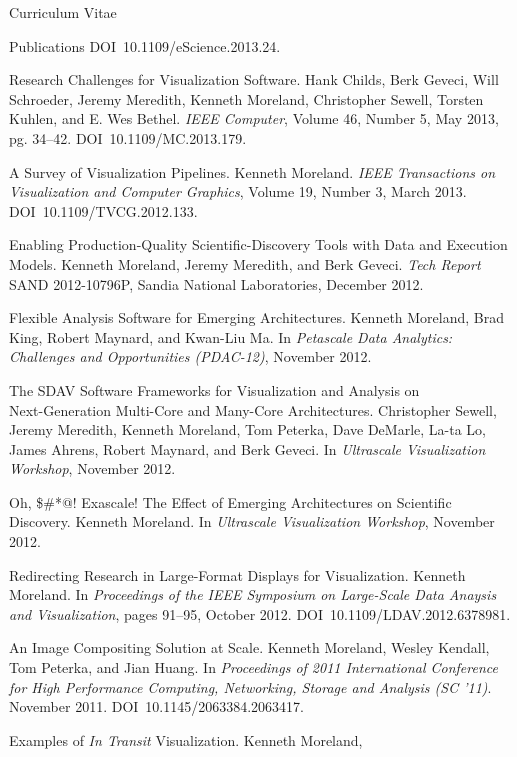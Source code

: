 \documentclass{article}
\begin{document}
\begin{cv}{Curriculum Vitae}
\begin{cvlist}{Publications}
      DOI~10.1109/eScience.2013.24.
    \item[Research Challenges for Visualization Software.] Hank Childs, Berk
      Geveci, Will Schroeder, Jeremy Meredith, Kenneth Moreland,
      Christopher Sewell, Torsten Kuhlen, and E. Wes Bethel. \emph{IEEE
        Computer}, Volume 46, Number 5, May 2013, pg. 34--42.
      DOI~10.1109/MC.2013.179.
    \item[A Survey of Visualization Pipelines.] Kenneth
      Moreland. \emph{IEEE Transactions on Visualization and Computer
        Graphics}, Volume 19, Number 3, March 2013.
      DOI~10.1109/TVCG.2012.133.
    \item[Enabling Production-Quality Scientific-Discovery Tools with Data
      and] Execution Models. Kenneth Moreland, Jeremy Meredith, and Berk
      Geveci. \emph{Tech Report} SAND 2012-10796P, Sandia National
      Laboratories, December 2012.
    \item[Flexible Analysis Software for Emerging Architectures.] Kenneth
      Moreland, Brad King, Robert Maynard, and Kwan-Liu Ma. In
      \emph{Petascale Data Analytics: Challenges and Opportunities
        (PDAC-12)}, November 2012.
    \item[The SDAV Software Frameworks for Visualization and Analysis on]~\\
      Next-Generation Multi-Core and Many-Core Architectures. Christopher
      Sewell, Jeremy Meredith, Kenneth Moreland, Tom Peterka, Dave DeMarle,
      La-ta Lo, James Ahrens, Robert Maynard, and Berk Geveci. In
      \emph{Ultrascale Visualization Workshop}, November 2012.
    \item[Oh, \$\#*@!  Exascale!  The Effect of Emerging Architectures on
      Scientific] Discovery.  Kenneth Moreland.  In \emph{Ultrascale
      Visualization Workshop}, November 2012.
    \item[Redirecting Research in Large-Format Displays for Visualization.]
      Kenneth Moreland. In \emph{Proceedings of the IEEE Symposium on
        Large-Scale Data Anaysis and Visualization}, pages 91--95, October
      2012. DOI~10.1109/LDAV.2012.6378981.
    \item[An Image Compositing Solution at Scale.] Kenneth Moreland, Wesley
      Kendall, Tom Peterka, and Jian Huang. In \emph{Proceedings of 2011
        International Conference for High Performance Computing,
        Networking, Storage and Analysis (SC '11)}. November
      2011. DOI~10.1145/2063384.2063417.
    \item[Examples of \emph{In Transit} Visualization.] Kenneth Moreland,

\end{cvlist}
\end{cv}
\end{document}
